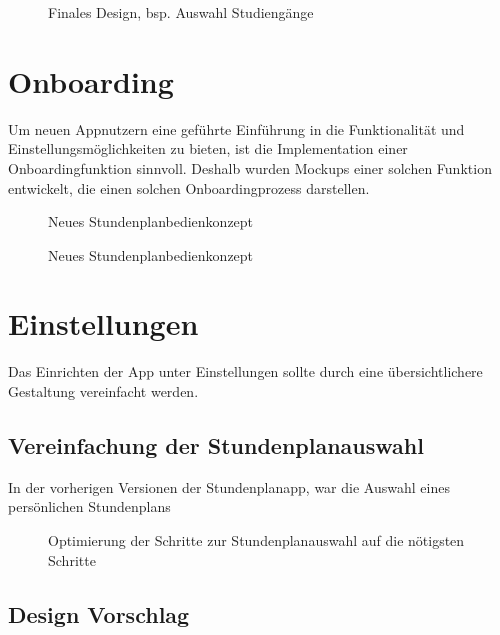 \begin{figure}[H]
	\centering
	\caption{Finales Design, bsp. Auswahl Studiengänge}
	\label{fig1}
\end{figure}




\section{Onboarding}

Um neuen Appnutzern eine geführte Einführung in die Funktionalität und Einstellungsmöglichkeiten zu bieten, ist die Implementation einer Onboardingfunktion sinnvoll. Deshalb wurden Mockups einer solchen Funktion entwickelt, die einen solchen Onboardingprozess darstellen.

\begin{figure}[H]
	\centering
	\caption{Neues Stundenplanbedienkonzept}
	\label{fig1}
\end{figure}

\begin{figure}[H]
	\centering
	\caption{Neues Stundenplanbedienkonzept}
	\label{fig1}
\end{figure}


\section{Einstellungen}
Das Einrichten der App unter Einstellungen sollte durch eine übersichtlichere Gestaltung vereinfacht werden. 

\subsection{Vereinfachung der Stundenplanauswahl}
In der vorherigen Versionen der Stundenplanapp, war die Auswahl eines persönlichen Stundenplans 

\begin{figure}[H]
	\centering
	\caption{Optimierung der Schritte zur Stundenplanauswahl auf die nötigsten Schritte}
	\label{fig1}
\end{figure}

\subsection{Design Vorschlag}

